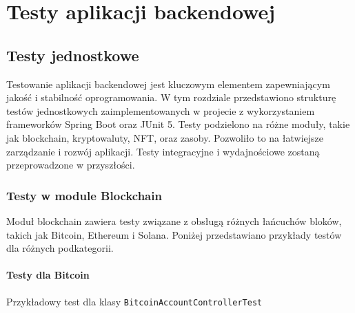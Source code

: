 \chapter{Testy aplikacji backendowej}

\section{Testy jednostkowe}
Testowanie aplikacji backendowej jest kluczowym elementem zapewniającym jakość i stabilność oprogramowania. W tym rozdziale przedstawiono strukturę testów jednostkowych zaimplementowanych w projecie z wykorzystaniem frameworków Spring Boot oraz JUnit 5. Testy podzielono na różne moduły, takie jak blockchain, kryptowaluty, NFT, oraz zasoby. Pozwoliło to na łatwiejsze zarządzanie i rozwój aplikacji. Testy integracyjne i wydajnościowe zostaną przeprowadzone w przyszłości.

\subsection{Testy w module Blockchain}

Moduł blockchain zawiera testy związane z obsługą różnych łańcuchów bloków, takich jak Bitcoin, Ethereum i Solana. Poniżej przedstawiano przykłady testów dla różnych podkategorii.

\subsubsection{Testy dla Bitcoin}

Przykładowy test dla klasy \texttt{BitcoinAccountControllerTest}

